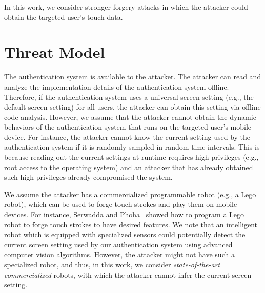 \documentclass{sig-alternate-05-2015}
\begin{document}
In this work, we consider stronger forgery attacks in which the attacker
 could obtain the targeted user's touch data.








\section{Threat Model}
\label{sec:threat}

The authentication system is available to the attacker. The attacker can
read and analyze the implementation details of the authentication system
offline. Therefore, if the authentication system uses a universal screen setting
(e.g., the default screen setting) for all users,
the attacker can obtain this setting via offline code analysis. However, we
assume that the attacker cannot obtain the dynamic behaviors of the
authentication system that runs on the targeted user's mobile device. For instance, 
the attacker cannot know the
current setting used by the authentication system if it is randomly sampled  in
random time intervals. This is because 
reading out the current settings at runtime requires high
privileges (e.g., root access to the operating system) and an attacker that has
already obtained such high privileges already compromised the system.

 We assume the attacker has a commercialized programmable 
 robot (e.g., a Lego robot), 
 which can be used to forge touch strokes and play them on mobile devices. 
 For instance, Serwadda and Phoha~\cite{attack-CCS13} showed 
 how to program a Lego robot to forge  touch strokes  to have desired  features. 
We note that an intelligent robot which is equipped with specialized sensors could potentially detect the current screen setting used by our authentication system using advanced computer vision algorithms. However, the attacker might not have such a specialized robot, and thus, in this work, we consider  \emph{state-of-the-art commercialized} robots, with which the attacker cannot infer the current screen setting.
\end{document}
